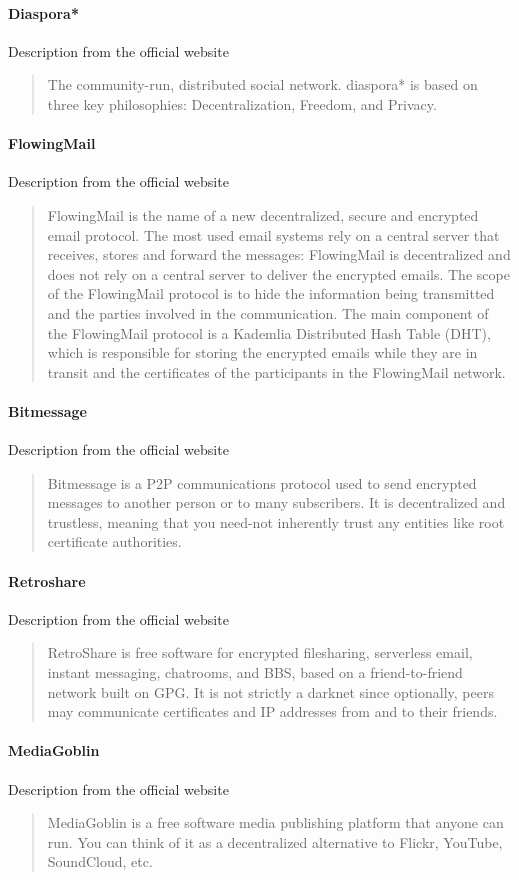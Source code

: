 \paragraph{Diaspora*}
Description from the official website \cite{DiasporaDiaspora}
\blockquote{
The community-run, distributed social network. diaspora* is based on three key philosophies: Decentralization, Freedom, and Privacy.
}

\paragraph{FlowingMail}
Description from the official website \cite{FlowingMailFlowingMail}
\blockquote{FlowingMail is the name of a new decentralized, secure and encrypted email protocol.
The most used email systems rely on a central server that receives, stores and forward the messages: FlowingMail is decentralized and does not rely on a central server to deliver the encrypted emails.
The scope of the FlowingMail protocol is to hide the information being transmitted and the parties involved in the communication.
The main component of the FlowingMail protocol is a Kademlia Distributed Hash Table (DHT), which is responsible for storing the encrypted emails while they are in transit and the certificates of the participants in the FlowingMail network.}

\paragraph{Bitmessage\cite{Warren2012Bitmessage:System}}
Description from the official website \cite{BitmessageBitmessage}
\blockquote{Bitmessage is a P2P communications protocol used to send encrypted messages to another person or to many subscribers. It is decentralized and trustless, meaning that you need-not inherently trust any entities like root certificate authorities.}

\paragraph{Retroshare}
Description from the official website \cite{RetroshareRetroshare}
\blockquote{RetroShare is free software for encrypted filesharing, serverless email, instant messaging, chatrooms, and BBS, based on a friend-to-friend network built on GPG. It is not strictly a darknet since optionally, peers may communicate certificates and IP addresses from and to their friends.}

\paragraph{MediaGoblin\cite{Webber2016GNUDocumentation}}
Description from the official website \cite{MediaGoblinMediaGoblin}
\blockquote{MediaGoblin is a free software media publishing platform that anyone can run. You can think of it as a decentralized alternative to Flickr, YouTube, SoundCloud, etc.}


